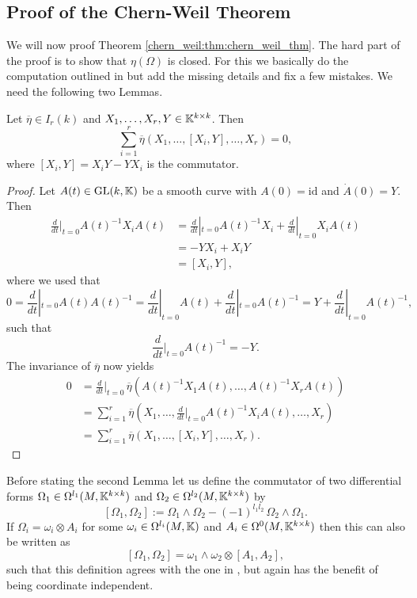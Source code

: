 \subsection{Proof of the Chern-Weil Theorem}

We will now proof Theorem \ref{chern_weil:thm:chern_weil_thm}. The hard part of the proof is to show that $\eta(\Omega)$ is closed. For this we basically do the computation outlined in \cite{emilia_globale_ana} but add the missing details and fix a few mistakes. We need the following two Lemmas.

\begin{lemma}
    \label{chern_weil:lem:technical_lemma1}
    Let $\overline{\eta} \in I_r(k)$ and $X_1,\ldots,X_r,Y \in \mathbb{K}^{k \times k}$. Then 
    \[
    \sum_{i=1}^{r} \overline{\eta}(X_1,\ldots,[X_i,Y],\ldots,X_r) = 0,
    \]
    where $[X_i,Y] = X_iY - YX_i$ is the commutator.
\end{lemma}

\begin{proof}
    Let $A(t) \in \mathrm{GL}(k,\mathbb{K})$ be a smooth curve with $A(0) = \mathrm{id}$ and $\dot{A}(0) = Y$. Then 
    \begin{align*}
         \frac{d}{dt}|_{t=0} A(t)^{-1}X_iA(t) &= \frac{d}{dt}|_{t=0}A(t)^{-1}X_i + \frac{d}{dt}|_{t=0}X_iA(t) \\ &= -YX_i + X_iY \\ &= [X_i,Y],
    \end{align*}
    where we used that 
    \[
    0 = \frac{d}{dt}|_{t=0} A(t)A(t)^{-1} = \frac{d}{dt}|_{t=0} A(t) + \frac{d}{dt}|_{t=0} A(t)^{-1} = Y + \frac{d}{dt}|_{t=0} A(t)^{-1},
    \]
    such that 
    \[
    \frac{d}{dt}|_{t=0} A(t)^{-1} = -Y.
    \]
    The invariance of $\overline{\eta}$ now yields 
    \begin{align*}
        0 &= \frac{d}{dt}|_{t=0} \, \overline{\eta}(A(t)^{-1}X_1A(t),\ldots,A(t)^{-1}X_rA(t)) \\
        &= \sum_{i=1}^{r}\overline{\eta}(X_1,\ldots,\frac{d}{dt}|_{t=0}A(t)^{-1}X_iA(t),\ldots,X_r)\\
        &= \sum_{i=1}^{r} \overline{\eta}(X_1,\ldots,[X_i,Y],\ldots,X_r).
    \end{align*}
\end{proof}

Before stating the second Lemma let us define the commutator of two differential forms $\Omega_1 \in \Omega^{l_1}(M,\mathbb{K}^{k \times k})$ and $\Omega_2 \in \Omega^{l_2}(M,\mathbb{K}^{k \times k})$ by 
\[
[\Omega_1,\Omega_2] := \Omega_1 \wedge \Omega_2 - (-1)^{l_1l_2} \, \Omega_2 \wedge \Omega_1.
\]
If $\Omega_i = \omega_i \otimes A_i$ for some $\omega_i \in \Omega^{l_i}(M,\mathbb{K})$ and $A_i \in \Omega^0(M,\mathbb{K}^{k \times k})$ then this can also be written as 
\[
[\Omega_1,\Omega_2] = \omega_1 \wedge \omega_2 \otimes [A_1,A_2],
\]
such that this definition agrees with the one in \cite{emilia_globale_ana}, but again has the benefit of being coordinate independent.

